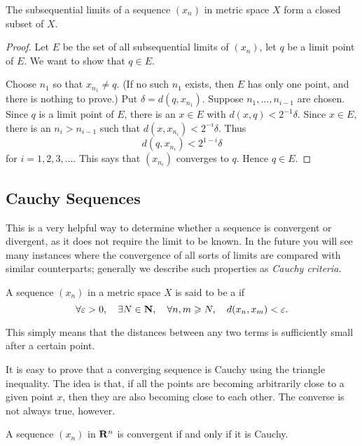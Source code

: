 \begin{proposition}
The subsequential limits of a sequence $(x_n)$ in metric space $X$ form a closed subset of $X$.
\end{proposition}

\begin{proof}
Let $E$ be the set of all subsequential limits of $(x_n)$, let $q$ be a limit point of $E$. We want to show that $q\in E$.

Choose $n_1$ so that $x_{n_1}\neq q$. (If no such $n_1$ exists, then $E$ has only one point, and there is nothing to prove.) Put $\delta=d(q,x_{n_1})$. Suppose $n_1,\dots,n_{i-1}$ are chosen. Since $q$ is a limit point of $E$, there is an $x\in E$ with $d(x,q)<2^{-1}\delta$. Since $x\in E$, there is an $n_i>n_{i-1}$ such that $d(x,x_{n_i})<2^{-i}\delta$. Thus
\[d(q,x_{n_i})<2^{1-i}\delta\]
for $i=1,2,3,\dots$. This says that $(x_{n_i})$ converges to $q$. Hence $q\in E$.
\end{proof}

\subsection{Cauchy Sequences}
This is a very helpful way to determine whether a sequence is convergent or divergent, as it does not require the limit to be known. In the future you will see many instances where the convergence of all sorts of limits are compared with similar counterparts; generally we describe such properties as \emph{Cauchy criteria}.

\begin{definition}
A sequence $(x_n)$ in a metric space $X$ is said to be a  if 
\[\forall\varepsilon>0,\quad\exists N\in\mathbf N,\quad\forall n,m\geqslant N,\quad d(x_n,x_m)<\varepsilon.\]
\end{definition}

\begin{remark}
This simply means that the distances between any two terms is sufficiently small after a certain point.
\end{remark}

It is easy to prove that a converging sequence is Cauchy using the triangle inequality. The idea is that, if all the points are becoming arbitrarily close to a given point $x$, then they are also becoming close to each other. The converse is not always true, however.

\begin{proposition}
A sequence $(x_n)$ in $\mathbf R^n$ is convergent if and only if it is Cauchy.
\end{proposition}

